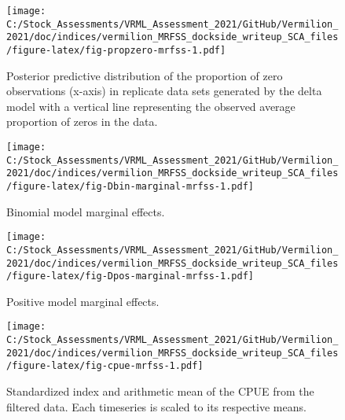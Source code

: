 \documentclass[
]{article}
\begin{document}
\begin{figure}
\centering
\texttt{[image: C:/Stock\_Assessments/VRML\_Assessment\_2021/GitHub/Vermilion\_2021/doc/indices/vermilion\_MRFSS\_dockside\_writeup\_SCA\_files/figure-latex/fig-propzero-mrfss-1.pdf]}
\caption{\label{fig:fig-propzero-mrfss}Posterior predictive distribution of the proportion of zero observations (x-axis) in replicate data sets generated by the delta model with a vertical line representing the observed average proportion of zeros in the data.}
\end{figure}

\FloatBarrier

\begin{figure}
\centering
\texttt{[image: C:/Stock\_Assessments/VRML\_Assessment\_2021/GitHub/Vermilion\_2021/doc/indices/vermilion\_MRFSS\_dockside\_writeup\_SCA\_files/figure-latex/fig-Dbin-marginal-mrfss-1.pdf]}
\caption{\label{fig:fig-Dbin-marginal-mrfss}Binomial model marginal effects.}
\end{figure}

\begin{figure}
\centering
\texttt{[image: C:/Stock\_Assessments/VRML\_Assessment\_2021/GitHub/Vermilion\_2021/doc/indices/vermilion\_MRFSS\_dockside\_writeup\_SCA\_files/figure-latex/fig-Dpos-marginal-mrfss-1.pdf]}
\caption{\label{fig:fig-Dpos-marginal-mrfss}Positive model marginal effects.}
\end{figure}

\begin{figure}
\centering
\texttt{[image: C:/Stock\_Assessments/VRML\_Assessment\_2021/GitHub/Vermilion\_2021/doc/indices/vermilion\_MRFSS\_dockside\_writeup\_SCA\_files/figure-latex/fig-cpue-mrfss-1.pdf]}
\caption{\label{fig:fig-cpue-mrfss}Standardized index and arithmetic mean of the CPUE from the filtered data. Each timeseries is scaled to its respective means.}
\end{figure}
\end{document}
